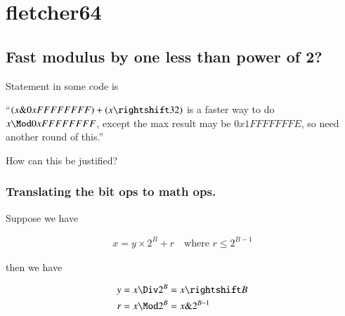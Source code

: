 
%
%




\chapter{fletcher64}
\label{chap:fletcher}
\date{ March dd, 2009.  $RCSfile: fletcher.tex,v $ Last $Revision: 1.8 $ $Date: 2009/06/14 23:51:45 $ }

%

\section{Fast modulus by one less than power of 2? }

Statement in some code is

``$(x \& 0xFFFFFFFF) + (x \rightshift 32)$ is a faster way to do $x \Mod 0xFFFFFFFF$, except the max result may be
$0x1FFFFFFFE$, so need another round of this.''

How can this be justified?

\subsection{Translating the bit ops to math ops. }

Suppose we have 

\begin{align}\label{eqn:fletcher:modPower2}
x = y \times 2^B + r \quad \mbox{where $r \le 2^{B-1}$}
\end{align}

then we have

\begin{align*}
y &= x \Div 2^{B} = x \rightshift B \\
r &= x \Mod 2^B = x \& 2^{B-1}
\end{align*}


